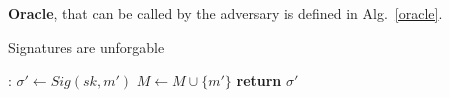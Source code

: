 \textbf{Oracle}, that can be called by the adversary is defined in Alg.~\ref{oracle}.
\begin{algorithm}
\caption{Signatures are unforgable}
\label{oracle}
\begin{algorithmic}[1]
:
    \State $\sigma' \leftarrow Sig(sk, m')$
    \State $M \leftarrow M \cup \{m'\}$
    \State \textbf{return} $\sigma'$
\EndFunction
\end{algorithmic}
\end{algorithm}
